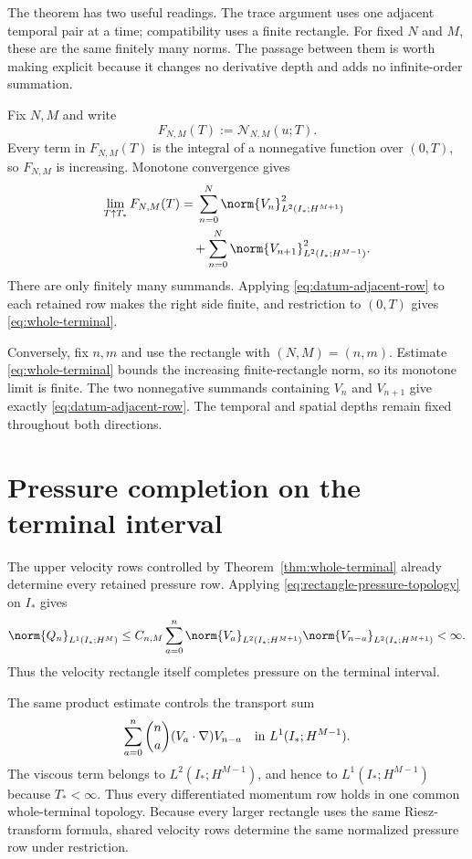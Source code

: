 The theorem has two useful readings.  The trace argument uses one adjacent
temporal pair at a time; compatibility uses a finite rectangle.  For fixed
\(N\) and \(M\), these are the same finitely many norms.  The passage between
them is worth making explicit because it changes no derivative depth and adds
no infinite-order summation.

Fix \(N,M\) and write
\[
 F_{N,M}(T):=\mathcal N_{N,M}(u;T).
\]
Every term in \(F_{N,M}(T)\) is the integral of a nonnegative function over
\((0,T)\), so \(F_{N,M}\) is increasing.  Monotone convergence gives
\begin{align*}
 \lim_{T\uparrow T_*}F_{N,M}(T)
 &={}
 \sum_{n=0}^{N}
 \norm{V_n}_{L^2(I_*;H^{M+1})}^2
 \\
 &\quad+
 \sum_{n=0}^{N}
 \norm{V_{n+1}}_{L^2(I_*;H^{M-1})}^2.
\end{align*}
There are only finitely many summands.  Applying
\eqref{eq:datum-adjacent-row} to each retained row makes the right side
finite, and restriction to \((0,T)\) gives \eqref{eq:whole-terminal}.

Conversely, fix \(n,m\) and use the rectangle with \((N,M)=(n,m)\).
Estimate \eqref{eq:whole-terminal} bounds the increasing finite-rectangle
norm, so its monotone limit is finite.  The two nonnegative summands
containing \(V_n\) and \(V_{n+1}\) give exactly
\eqref{eq:datum-adjacent-row}.  The temporal and spatial depths remain fixed
throughout both directions.

\section{Pressure completion on the terminal interval}

The upper velocity rows controlled by Theorem~\ref{thm:whole-terminal}
already determine every retained pressure row.  Applying
\eqref{eq:rectangle-pressure-topology} on \(I_*\) gives
\begin{equation}
 \norm{Q_n}_{L^1(I_*;H^M)}
 \le C_{n,M}\sum_{a=0}^{n}
 \norm{V_a}_{L^2(I_*;H^{M+1})}
 \norm{V_{n-a}}_{L^2(I_*;H^{M+1})}
 <\infty.
 \label{eq:whole-terminal-pressure}
\end{equation}
Thus the velocity rectangle itself completes pressure on the terminal
interval.

The same product estimate controls the transport sum
\begin{equation*}
 \sum_{a=0}^{n}\binom na(V_a\cdot\nabla)V_{n-a}
 \quad\hbox{in }L^1(I_*;H^{M-1}).
\end{equation*}
The viscous term belongs to
\(L^2(I_*;H^{M-1})\), and hence to \(L^1(I_*;H^{M-1})\) because
\(T_*<\infty\).  Thus every differentiated momentum row holds in one common
whole-terminal topology.  Because every larger rectangle uses the same
Riesz-transform formula, shared velocity rows determine the same normalized
pressure row under restriction.

